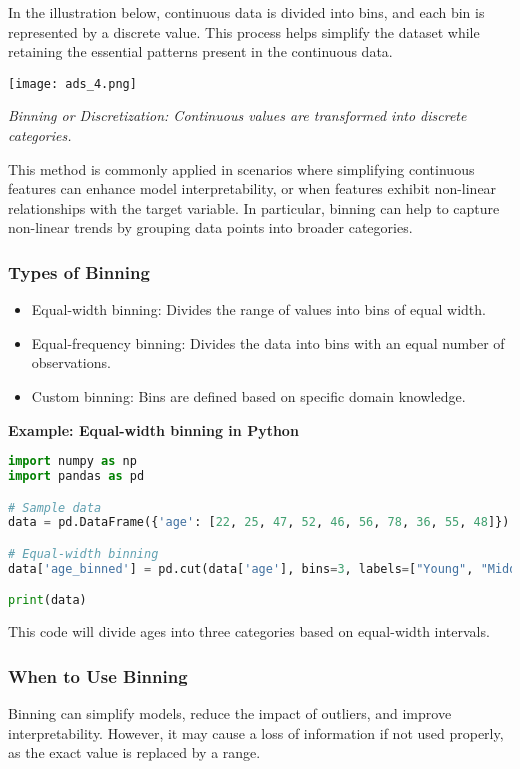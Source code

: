 \documentclass{article}
\begin{document}
In the illustration below, continuous data is divided into bins, and each bin is represented by a discrete value. This process helps simplify the dataset while retaining the essential patterns present in the continuous data.

\begin{center}

\texttt{[image: ads\_4.png]}

\end{center}

\textit{Binning or Discretization: Continuous values are transformed into discrete categories.}

This method is commonly applied in scenarios where simplifying continuous features can enhance model interpretability, or when features exhibit non-linear relationships with the target variable. In particular, binning can help to capture non-linear trends by grouping data points into broader categories.

\subsubsection{Types of Binning}
\begin{itemize}
    \item Equal-width binning: Divides the range of values into bins of equal width.
    \item Equal-frequency binning: Divides the data into bins with an equal number of observations.
    \item Custom binning: Bins are defined based on specific domain knowledge.
\end{itemize}

\textbf{Example: Equal-width binning in Python}

\begin{lstlisting}[language=Python]
import numpy as np
import pandas as pd

# Sample data
data = pd.DataFrame({'age': [22, 25, 47, 52, 46, 56, 78, 36, 55, 48]})

# Equal-width binning
data['age_binned'] = pd.cut(data['age'], bins=3, labels=["Young", "Middle-aged", "Old"])

print(data)
\end{lstlisting}

This code will divide ages into three categories based on equal-width intervals.

\subsubsection{When to Use Binning}
Binning can simplify models, reduce the impact of outliers, and improve interpretability. However, it may cause a loss of information if not used properly, as the exact value is replaced by a range.
\end{document}
